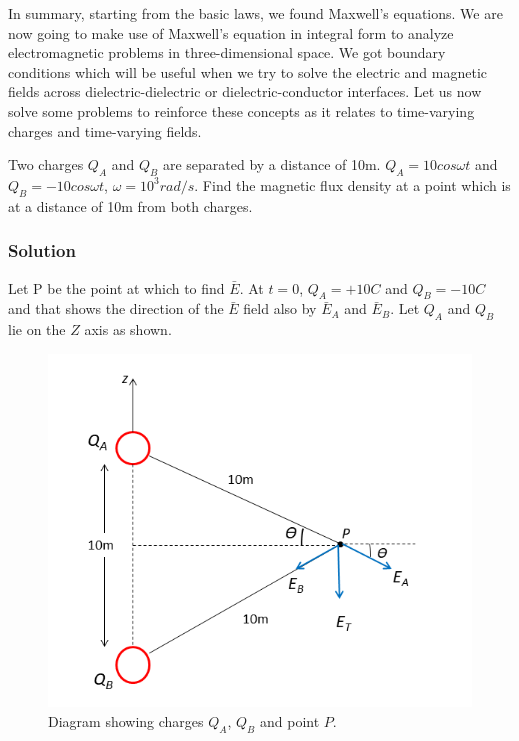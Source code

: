 In summary, starting from the basic laws, we found Maxwell's equations. We are now going to make use of Maxwell's equation in integral form to analyze electromagnetic problems in three-dimensional space. We got boundary conditions which will be useful when we try to solve the electric and magnetic fields across dielectric-dielectric or dielectric-conductor interfaces. Let us now solve some problems to reinforce these concepts as it relates to time-varying charges and time-varying fields.
\begin{exmp}
Two charges $Q_A$ and $Q_B$ are separated by a distance of 10m. $Q_A = 10cos\omega t$ and $Q_B = -10cos\omega t$, $\omega = 10^3 rad/s$. Find the magnetic flux density at a point which is at a distance of 10m from both charges.

\subsubsection*{Solution}
Let P be the point at which to find $\bar{E}$. At $t = 0$, $Q_A = +10C$ and $Q_B = -10C$ and that shows the direction of the $\bar{E}$ field also by $\bar{E}_{A}$ and $\bar{E}_{B}$. Let $Q_A$ and $Q_B$ lie on the $Z$ axis as shown.
\begin{figure}[h]
\centering
\includegraphics[width=1\linewidth]{./graphics/fig20.10}
\caption{Diagram showing charges $Q_A$, $Q_B$ and point $P$.}
\end{figure}


\end{exmp}
